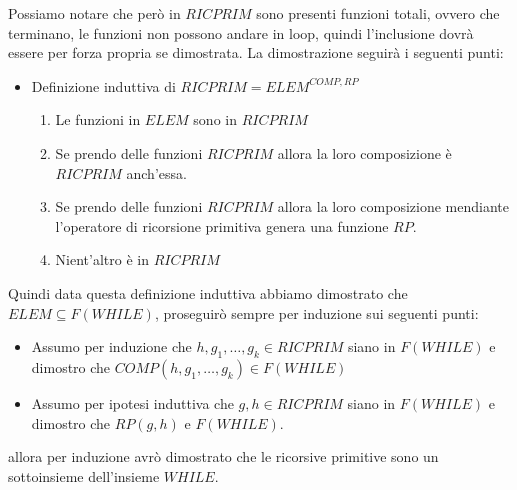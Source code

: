 \documentclass{article}
\begin{document}
Possiamo notare che però in $RICPRIM$ sono presenti funzioni totali, ovvero che terminano,
le funzioni non possono andare in loop, quindi l'inclusione dovrà essere per forza propria
se dimostrata.
La dimostrazione seguirà i seguenti punti:
\begin{itemize}
    \item Definizione induttiva di $RICPRIM=ELEM^{COMP,RP}$
          \begin{enumerate}
              \item Le funzioni in $ELEM$ sono in $RICPRIM$
              \item Se prendo delle funzioni $RICPRIM$ allora la loro composizione è
                    $RICPRIM$ anch'essa.
              \item Se prendo delle funzioni $RICPRIM$ allora la loro composizione mendiante l'operatore
                    di ricorsione primitiva genera una funzione $RP$.
              \item Nient'altro è in $RICPRIM$
          \end{enumerate}
\end{itemize}

Quindi data questa definizione induttiva abbiamo dimostrato che $ELEM\subseteq F(WHILE)$,
proseguirò sempre per induzione sui seguenti punti:
\begin{itemize}
    \item Assumo per induzione che $h,g_1,\dots,g_k\in RICPRIM$ siano in $F(WHILE)$
          e dimostro che $COMP(h,g_1,\dots,g_k)\in F(WHILE)$
    \item Assumo per ipotesi induttiva che $g,h\in RICPRIM$ siano in $F(WHILE)$
          e dimostro che $RP(g,h)$ e $F(WHILE)$.
\end{itemize}

allora per induzione avrò dimostrato che le ricorsive primitive sono un sottoinsieme
dell'insieme $WHILE$.
\end{document}
